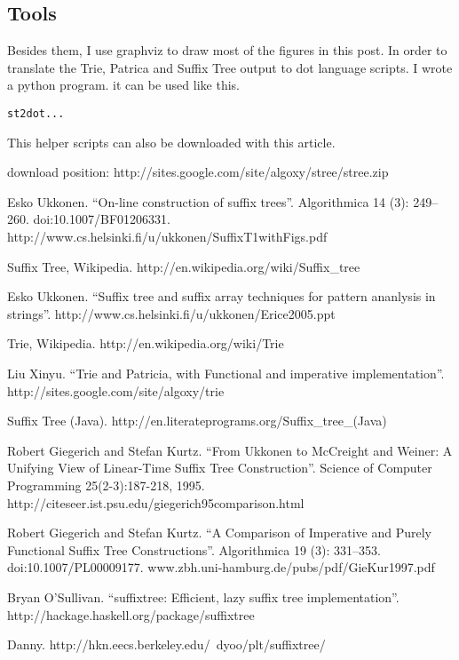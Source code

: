 \documentclass{article}
\begin{document}
\subsection{Tools}

Besides them, I use graphviz to draw most of the figures in this post. In order to
translate the Trie, Patrica and Suffix Tree output to dot language scripts. I wrote a python program.
it can be used like this.

\begin{verbatim}
st2dot...
\end{verbatim}

This helper scripts can also be downloaded with this article.

download position: http://sites.google.com/site/algoxy/stree/stree.zip

\begin{thebibliography}{99}

Esko Ukkonen. ``On-line construction of suffix trees''. Algorithmica 14 (3): 249--260. doi:10.1007/BF01206331. http://www.cs.helsinki.fi/u/ukkonen/SuffixT1withFigs.pdf

Suffix Tree, Wikipedia. http://en.wikipedia.org/wiki/Suffix\_tree

Esko Ukkonen. ``Suffix tree and suffix array techniques for pattern ananlysis in strings''. http://www.cs.helsinki.fi/u/ukkonen/Erice2005.ppt

Trie, Wikipedia. http://en.wikipedia.org/wiki/Trie

Liu Xinyu. ``Trie and Patricia, with Functional and imperative implementation''. http://sites.google.com/site/algoxy/trie

Suffix Tree (Java). http://en.literateprograms.org/Suffix\_tree\_(Java)

Robert Giegerich and Stefan Kurtz. ``From Ukkonen to McCreight and Weiner: A Unifying View of Linear-Time Suffix Tree Construction''. Science of Computer Programming 25(2-3):187-218, 1995. http://citeseer.ist.psu.edu/giegerich95comparison.html

Robert Giegerich and Stefan Kurtz. ``A Comparison of Imperative and Purely Functional Suffix Tree Constructions''. Algorithmica 19 (3): 331--353. doi:10.1007/PL00009177. www.zbh.uni-hamburg.de/pubs/pdf/GieKur1997.pdf

Bryan O'Sullivan. ``suffixtree: Efficient, lazy suffix tree implementation''. http://hackage.haskell.org/package/suffixtree

Danny. http://hkn.eecs.berkeley.edu/~dyoo/plt/suffixtree/

\end{thebibliography}

\ifx\wholebook\relax \else
\end{document}
